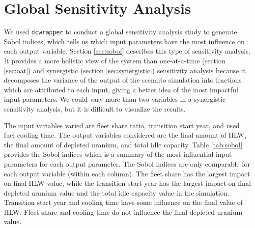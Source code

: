 \section{Global Sensitivity Analysis}
We used \texttt{dcwrapper} to conduct a global sensitivity 
analysis study to generate Sobol indices, which tells us which 
input parameters have the most influence on each output variable.
Section \ref{sec:sobol} describes this type of sensitivity 
analysis.
It provides a more holistic view of the system 
than one-at-a-time (section \ref{sec:oat}) and 
synergistic (section \ref{sec:synergistic}) sensitivity 
analysis because it decomposes the variance of the 
output of the scenario simulation into fractions which are 
attributed to each input, giving a better idea of the
most impactful input parameters. 
We could vary more than two variables in a synergistic 
sensitivity analysis, but it is difficult to visualize the results.

The input variables varied are fleet share ratio, 
transition start year, and used fuel cooling time.
The output variables considered are the final amount of HLW, 
the final amount of depleted uranium, and total idle capacity. 
Table \ref{tab:sobol} provides the Sobol indices which is 
a summary of the most influential input parameters 
for each output parameter. 
The Sobol indices are only comparable for each output variable 
(within each column). 
The fleet share has the largest impact on 
final HLW value, while the transition start year has the largest 
impact on final depleted uranium value and the total idle 
capacity value in the simulation. 
Transition start year and cooling time have some influence on 
the final value of HLW. 
Fleet share and cooling time do not influence the final 
depleted uranium value. 
    
